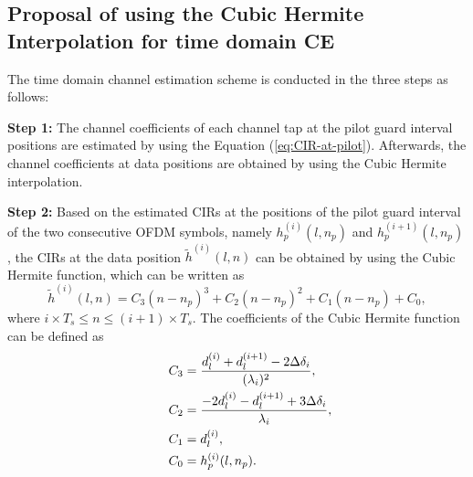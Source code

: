 \documentclass[AMA]{WileyNJD-v1}
\begin{document}
	
\subsection{Proposal of using the Cubic Hermite Interpolation for time domain CE}
	
The time domain  channel estimation scheme  is conducted in the three steps as follows:
	
\rm{\textbf {Step 1:} The channel coefficients of each channel tap at the pilot guard interval positions are estimated by using the Equation (\ref{eq:CIR-at-pilot}). Afterwards, the channel coefficients at data positions are obtained by using the Cubic Hermite interpolation. 
		
		
\rm{\textbf {Step 2:} Based on the estimated CIRs at the positions of the pilot guard interval of the two consecutive OFDM symbols, namely $h^{(i)}_{p}(l,n_p)$ and $h^{(i+1)}_{p}(l,n_p)$,  the CIRs at the data position $\tilde h^{(i)}(l,n)$  can be obtained  by using the Cubic Hermite function, which can be written as 
%
\begin{equation}\label{eq:cubic-hermite}
			\tilde h^{(i)}(l,n) = C_3(n - n_{p})^3 + C_2(n - n_{p})^2 + C_1(n-n_{p}) + C_0,
\end{equation}
%
where $i\times T_{s}\leq n\leq (i+1)\times T_{s}$. The coefficients of the Cubic Hermite function can be defined as
\begin{align*}
			\centering
			C_3 &= \frac{d^{(i)}_{l}+d^{(i+1)}_{l}-2{\Delta {\delta _i}}}{(\lambda_{i})^2},\\
			C_2 &= \dfrac{-2d^{(i)}_{l}-d^{(i+1)}_{l}+3{\Delta {\delta _i}}}{\lambda_{i}},\\
			\qquad C_1 &=d^{(i)}_{l},\\
			C_0 &= h^{(i)}_{p}(l,n_p).
\end{align*}	
%
			
}}
\end{document}
